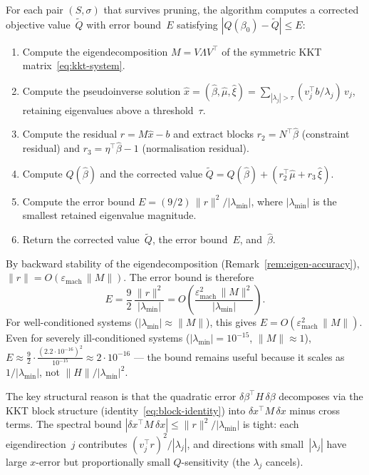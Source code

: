 \begin{algorithm}%
\label{alg:q-error-bound}
For each pair $(S, \sigma)$ that survives pruning,
the algorithm computes a corrected objective
value~$\tilde Q$ with error bound~$E$
satisfying $|Q(\beta_0) - \tilde Q| \leq E$:
\begin{enumerate}
\item Compute the eigendecomposition
  $M = V \Lambda V^\top$ of the symmetric KKT
  matrix~\eqref{eq:kkt-system}.
\item Compute the pseudoinverse solution
  $\hat x = (\hat\beta, \hat\mu, \hat\xi)
    = \sum_{|\lambda_j| > \tau}
      (v_j^\top b / \lambda_j)\, v_j$,
  retaining eigenvalues above a threshold~$\tau$.
\item Compute the residual $r = M\hat x - b$ and
  extract blocks $r_2 = N^\top\hat\beta$
  (constraint residual)
  and $r_3 = \eta^\top\hat\beta - 1$
  (normalisation residual).
\item Compute $Q(\hat\beta)$ and the corrected value
  $\tilde Q = Q(\hat\beta)
    + (r_2^\top\hat\mu + r_3\,\hat\xi)$.
\item Compute the error bound
  $E = (9/2)\,\|r\|^2 / |\lambda_{\min}|$,
  where $|\lambda_{\min}|$ is the smallest
  retained eigenvalue magnitude.
\item Return the corrected value~$\tilde Q$,
  the error bound~$E$, and~$\hat\beta$.
\end{enumerate}
\end{algorithm}

\begin{remark}%
\label{rem:error-bound-magnitude}
By backward stability of the eigendecomposition
(Remark~\ref{rem:eigen-accuracy}),
$\|r\| = O(\varepsilon_{\mathrm{mach}}\,\|M\|)$.
The error bound is therefore
\[
  E
  = \frac{9}{2}\,
    \frac{\|r\|^2}{|\lambda_{\min}|}
  = O\!\left(
    \frac{\varepsilon_{\mathrm{mach}}^2\,\|M\|^2}
         {|\lambda_{\min}|}
  \right).
\]
For well-conditioned systems
($|\lambda_{\min}| \approx \|M\|$),
this gives $E = O(\varepsilon_{\mathrm{mach}}^2\,\|M\|)$.
Even for severely ill-conditioned systems
($|\lambda_{\min}| = 10^{-15}$, $\|M\| \approx 1$),
$E \approx \frac{9}{2} \cdot \frac{(2.2 \cdot 10^{-16})^2}{10^{-15}}
\approx 2 \cdot 10^{-16}$
--- the bound remains useful
because it scales as $1/|\lambda_{\min}|$,
not $\|H\|/|\lambda_{\min}|^2$.

The key structural reason is that the quadratic
error $\delta\beta^\top H\,\delta\beta$ decomposes
via the KKT block structure
(identity~\eqref{eq:block-identity})
into $\delta x^\top M\,\delta x$ minus cross terms.
The spectral bound
$|\delta x^\top M\,\delta x| \leq \|r\|^2/|\lambda_{\min}|$
is tight: each eigendirection~$j$ contributes
$(v_j^\top r)^2/|\lambda_j|$,
and directions with small~$|\lambda_j|$
have large $x$-error but proportionally small
$Q$-sensitivity (the $\lambda_j$ cancels).
\end{remark}

